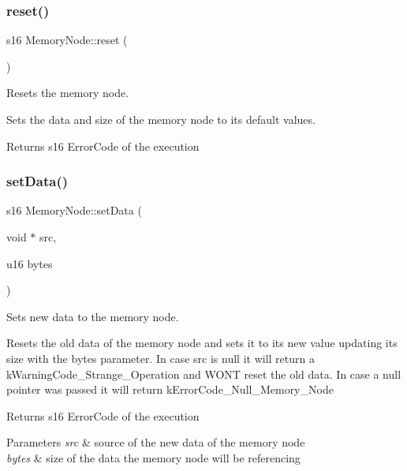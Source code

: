 \subsubsection{\texorpdfstring{reset()}{reset()}}
{\footnotesize\ttfamily s16 Memory\+Node\+::reset (\begin{DoxyParamCaption}{ }\end{DoxyParamCaption})}



Resets the memory node. 

Sets the data and size of the memory node to it\textquotesingle{}s default values.

\begin{DoxyReturn}{Returns}
s16 Error\+Code of the execution 
\end{DoxyReturn}
\mbox{\label{class_memory_node_af4631d27eef2e810df9767b66f46e26b}} 
\subsubsection{\texorpdfstring{set\+Data()}{setData()}}
{\footnotesize\ttfamily s16 Memory\+Node\+::set\+Data (\begin{DoxyParamCaption}\item[{void $\ast$}]{src,  }\item[{u16}]{bytes }\end{DoxyParamCaption})}



Sets new data to the memory node. 

Resets the old data of the memory node and sets it to it\textquotesingle{}s new value updating it\textquotesingle{}s size with the bytes parameter. In case src is null it will return a k\+Warning\+Code\+\_\+\+Strange\+\_\+\+Operation and W\+ON\textquotesingle{}T reset the old data. In case a null pointer was passed it will return k\+Error\+Code\+\_\+\+Null\+\_\+\+Memory\+\_\+\+Node

\begin{DoxyReturn}{Returns}
s16 Error\+Code of the execution 
\end{DoxyReturn}

\begin{DoxyParams}{Parameters}
{\em src} & source of the new data of the memory node \\
\hline
{\em bytes} & size of the data the memory node will be referencing \\
\hline
\end{DoxyParams}
\mbox{\label{class_memory_node_ae5535f4947d24e5855aba8f9b2355c36}} 
